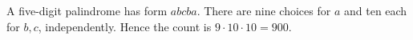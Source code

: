 A five-digit palindrome has form $abcba$. There are nine choices for $a$ and ten each for $b,c$, independently. Hence the count is $9\cdot10\cdot10=\boxed{900}$.
